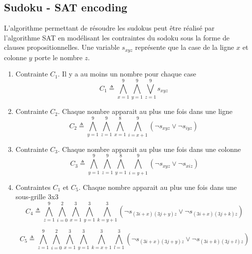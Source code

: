 \documentclass[11pt]{book}
\begin{document}
\subsection{Sudoku - SAT encoding}
L'algorithme permettant de résoudre les sudokus peut être réalisé par l'algorithme SAT en modélisant
les contraintes du sodoku sous la forme de clauses propositionnelles. Une variable $s_{xyz}$ représente que la
case de la ligne $x$ et colonne $y$ porte le nombre $z$.
\begin{enumerate}
	\item Contrainte $C_1$. Il y a au moins un nombre pour chaque case 
	$$ C_1 \triangleq \bigwedge _{x=1}^9  \bigwedge _{y=1}^9 \bigvee  _{z=1}^9 s_{xyz}$$

	\item Contrainte $C_2$.  Chaque nombre apparait au plus une fois dans une ligne
	$$  C_2 \triangleq \bigwedge _{y=1}^9  \bigwedge _{z=1}^9 \bigwedge _{x=1}^8 \bigwedge _{i=x+1}^9  ( \lnot s_{xyz} \vee \lnot s_{iyz} ) $$

	\item  Contrainte $C_3$. Chaque nombre apparait au plus une fois dans une colonne
	$$ \ C_3 \triangleq \bigwedge _{y=1}^9  \bigwedge _{z=1}^9 \bigwedge _{y=1}^8 \bigwedge _{i=y+1}^9  ( \lnot s_{xyz} \vee \lnot s_{xiz} ) $$

	\item  Contraintes $C_1$ et $C_5$. Chaque nombre apparait au plus une fois dans une sous-grille 3x3
	$$ \ C_4 \triangleq \bigwedge _{z=1}^9  \bigwedge _{i=0}^2 \bigwedge _{x=1}^3
	 \bigwedge _{y=1}^3  \bigwedge _{k=y+1}^3  ( \lnot s_{(3i+x)(3j+y)z} \vee \lnot s_{(3i+x)(3j+k)z} ) $$

	$$ \ C_5 \triangleq \bigwedge _{z=1}^9  \bigwedge _{i=0}^2 \bigwedge _{x=1}^3
	 \bigwedge _{y=1}^3  \bigwedge _{k=x+1}^3  \bigwedge _{l=1}^3  ( \lnot s_{(3i+x)(3j+y)z} \vee \lnot s_{(3i+k)(3j+l)z} ) $$
\end{enumerate}
\end{document}
